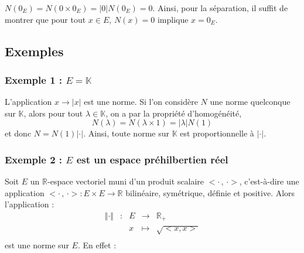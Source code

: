\documentclass[a4paper,10pt]{report}
\begin{document}
 \begin{Remarque}{} $N(0_E) = N(0 \times 0_E) = \vert 0 \vert N(0_E) = 0$. Ainsi, pour la séparation, il suffit de montrer que pour tout $x \in E$, $N(x)=0$ implique $x=0_E$.
 \end{Remarque}
 
 \subsection{Exemples}
 \subsubsection{Exemple 1 : $E= \mathbb{K}$}

L'application $x \rightarrow \vert x \vert$ est une norme. Si l'on considère $N$ une norme quelconque sur $\mathbb{K}$, alors pour tout $\lambda \in \mathbb{K}$, on a par la propriété d'homogénéité,
$$ N(\lambda) = N( \lambda \times 1) = \vert \lambda \vert N(1)$$
et donc $N =N(1) \vert \cdot \vert$. Ainsi, toute norme sur $\mathbb{K}$ est proportionnelle à $\vert \cdot \vert$.

\subsubsection{Exemple 2 : $E$ est un espace préhilbertien réel}

Soit $E$ un $\mathbb{R}$-espace vectoriel muni d'un produit scalaire $<\cdot \, , \,\cdot>$, c'est-à-dire une application $<\cdot \, , \,\cdot> : E \times E \rightarrow \mathbb{R}$ bilinéaire, symétrique, définie et positive. Alors l'application :
$$ \begin{array}{ccccl}
\Vert \cdot \Vert & : & E & \rightarrow & \mathbb{R}_+ \\
& & x & \mapsto & \sqrt{<x,x>} \\
\end{array}$$ 
est une norme sur $E$. En effet :
\end{document}
